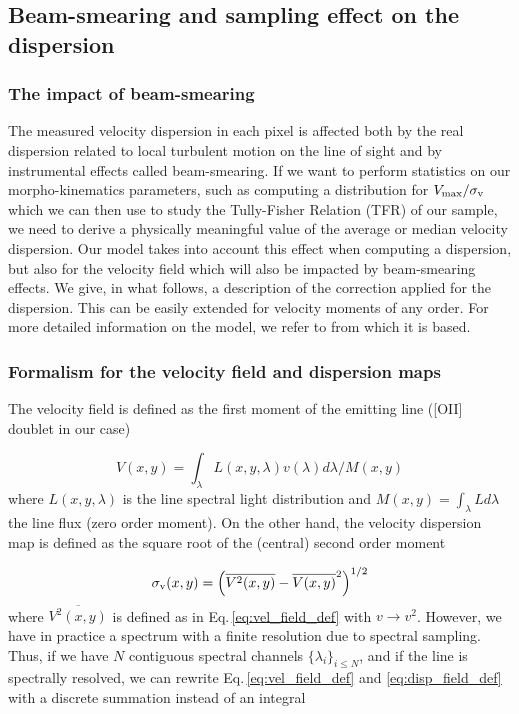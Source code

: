 \subsection{Beam-smearing and sampling effect on the dispersion}
\label{sec:beam_smearing_effect}

\subsubsection{The impact of beam-smearing}

The measured velocity dispersion in each pixel is affected both by the real dispersion related to local turbulent motion on the line of sight and by instrumental effects called beam-smearing. If we want to perform statistics on our morpho-kinematics parameters, such as computing a distribution for $V_{\rm{max}} / \sigma_{\rm{v}}$ which we can then use to study the Tully-Fisher Relation (TFR) of our sample, we need to derive a physically meaningful value of the average or median velocity dispersion. Our model takes into account this effect when computing a dispersion, but also for the velocity field which will also be impacted by beam-smearing effects. We give, in what follows, a description of the correction applied for the dispersion. This can be easily extended for velocity moments of any order. For more detailed information on the model, we refer to  from which it is based.

\subsubsection{Formalism for the velocity field and dispersion maps}
\label{sec:vel_field_and_disp_map}
The velocity field is defined as the first moment of the emitting line ([OII] doublet in our case)

\begin{equation}
	V(x,y) = \int_\lambda L(x,y,\lambda) v(\lambda) d\lambda / M(x, y)
	\label{eq:vel_field_def}
\end{equation}
where $L(x, y, \lambda)$ is the line spectral light distribution and $M(x,y) = \int_\lambda L d\lambda$ the line flux (zero order moment). On the other hand, the velocity dispersion map is defined as the square root of the (central) second order moment

\begin{equation}
	\sigma_{\rm{v}} (x,y) = \left ( \overline{V^2(x,y)} - \overline{V(x,y)}^2 \right )^{1/2}
	\label{eq:disp_field_def}
\end{equation}
where $\overline{V^2(x,y)}$ is defined as in Eq.\,\ref{eq:vel_field_def} with $v \rightarrow v^2$. However, we have in practice a spectrum with a finite resolution due to spectral sampling. Thus, if we have $N$ contiguous spectral channels $\lbrace \lambda_i \rbrace_{i\leq N}$, and if the line is spectrally resolved, we can rewrite Eq.\,\ref{eq:vel_field_def} and \ref{eq:disp_field_def} with a discrete summation instead of an integral

